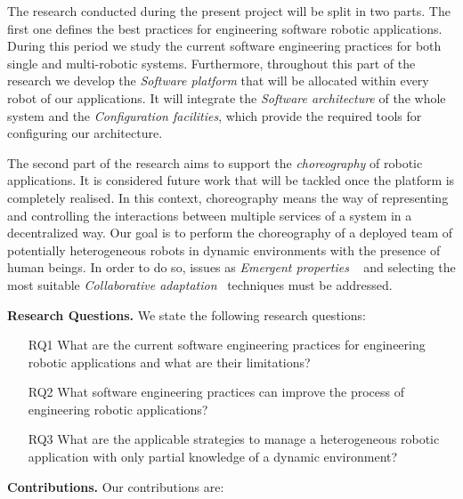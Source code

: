 The research conducted during the present project will be split in two parts.
The first one defines the best practices for engineering software robotic applications.
During this period we study the current software engineering practices for both single and multi-robotic systems.
Furthermore, throughout this part of the research we develop the \emph{Software platform} that will be allocated within every robot of our applications.
It will integrate the \emph{Software architecture} of the whole system and  the \emph{Configuration facilities}, which provide the required tools for configuring our architecture.%

The second part of the research aims to support the \emph{choreography} of robotic applications.
It is considered future work that will be tackled once the platform is completely realised.
In this context, choreography means the way of representing and controlling the interactions between multiple services of a system in a decentralized way.
Our goal is to perform the choreography of a deployed team of potentially heterogeneous robots in dynamic environments with the presence of human beings.
In order to do so, issues as \emph{Emergent properties} ~\cite{DeAngelis2016} and selecting the most suitable \emph{Collaborative adaptation}~\cite{Yan2013} techniques must be addressed.

\textbf{Research Questions.} 
We state the following research questions:
\begin{itemize}
\item[RQ1] What are the current software engineering practices for engineering robotic applications and what are their limitations?
\item[RQ2] What software engineering practices can improve the process of engineering robotic applications?
\item[RQ3] What are the applicable strategies to manage a heterogeneous robotic application with only partial knowledge of a dynamic environment?
\end{itemize}

\textbf{Contributions.} 
Our contributions are:

